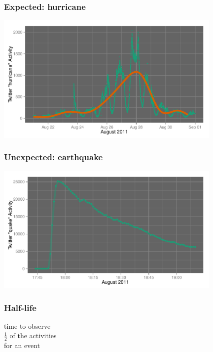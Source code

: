 \documentclass{beamer}
\begin{document}
\begin{frame}\frametitle{Expected: hurricane}
  \begin{center}
    \includegraphics[width=11cm]{./imgs/SMP_hurricane_trend.pdf}
  \end{center}
\end{frame}



\begin{frame}\frametitle{Unexpected: earthquake}
  \begin{center}
    \includegraphics[width=11cm]{./imgs/SMP_va_quake.pdf}
  \end{center}
\end{frame}

\begin{frame}\frametitle{Half-life}
\begin{center}
{\Huge time to observe \\[6pt] $\frac{1}{2}$ of the activities \\[6pt] for an event}
\end{center}
\end{frame}
\end{document}
